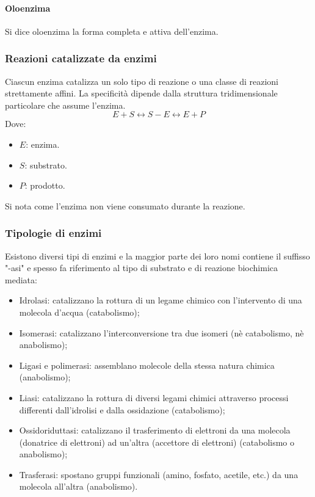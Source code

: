 			\paragraph{Oloenzima}
			Si dice oloenzima la forma completa e attiva dell'enzima.
		
		\subsubsection{Reazioni catalizzate da enzimi}
		Ciascun enzima catalizza un solo tipo di reazione o una classe di reazioni strettamente affini.
		La specificit\`a dipende dalla struttura tridimensionale particolare che assume l'enzima.
		\[E + S \leftrightarrow S-E \leftrightarrow E + P \]
		Dove:
		\begin{multicols}{2}
			\begin{itemize}
				\item $E$: enzima.
				\item $S$: substrato.
				\item $P$: prodotto.
			\end{itemize}
		\end{multicols}
		Si nota come l'enzima non viene consumato durante la reazione.

		\subsubsection{Tipologie di enzimi}
		Esistono diversi tipi di enzimi e la maggior parte dei loro nomi contiene il suffisso "-asi" e spesso fa riferimento al tipo di substrato e di reazione biochimica mediata:
		\begin{multicols}{2}
			\begin{itemize}
	    			\item Idrolasi: catalizzano la rottura di un legame chimico con l'intervento di una molecola d'acqua (catabolismo);
	    			\item Isomerasi: catalizzano l'interconversione tra due isomeri (n\`e catabolismo, n\`e anabolismo);
	    			\item Ligasi e polimerasi: assemblano molecole della stessa natura chimica (anabolismo);
	    			\item Liasi:  catalizzano la rottura di diversi legami chimici attraverso processi differenti dall'idrolisi e dalla ossidazione (catabolismo);
	    			\item Ossidoriduttasi: catalizzano il trasferimento di elettroni da una molecola (donatrice di elettroni) ad un'altra (accettore di elettroni) (catabolismo o anabolismo);
	    			\item Trasferasi: spostano gruppi funzionali (amino, fosfato, acetile, etc.) da una molecola all'altra (anabolismo).
			\end{itemize}
		\end{multicols}

